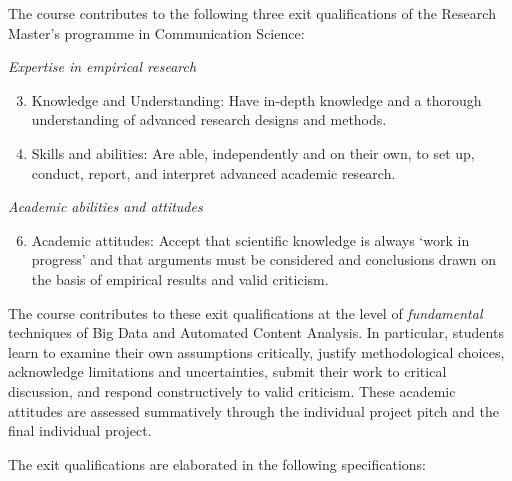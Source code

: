The course contributes to the following three exit qualifications of the Research Master's programme in Communication Science:

\textit{Expertise in empirical research}

\begin{enumerate}
    \setcounter{enumi}{2}
    \item Knowledge and Understanding: Have in-depth knowledge and a thorough understanding of advanced research designs and methods.
    \item Skills and abilities: Are able, independently and on their own, to set up, conduct, report, and interpret advanced academic research.
\end{enumerate}

\textit{Academic abilities and attitudes}

\begin{enumerate}
    \setcounter{enumi}{5}
    \item Academic attitudes: Accept that scientific knowledge is always `work in progress' and that arguments must be considered and conclusions drawn on the basis of empirical results and valid criticism.
\end{enumerate}

The course contributes to these exit qualifications at the level of \emph{fundamental} techniques of Big Data and Automated Content Analysis. In particular, students learn to examine their own assumptions critically, justify methodological choices, acknowledge limitations and uncertainties, submit their work to critical discussion, and respond constructively to valid criticism. These academic attitudes are assessed summatively through the individual project pitch and the final individual project.

The exit qualifications are elaborated in the following specifications:

